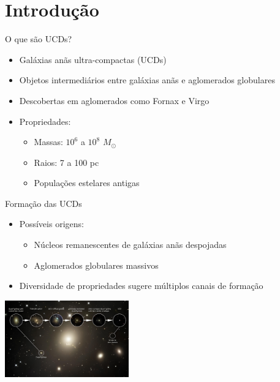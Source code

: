 \section{Introdução}


\begin{frame}[c]{O que são UCDs?}
    \begin{itemize}
        \item Galáxias anãs ultra-compactas (UCDs)
        \item Objetos intermediários entre galáxias anãs e aglomerados globulares
        \item Descobertas em aglomerados como Fornax e Virgo
        \item Propriedades:
        \begin{itemize}
            \item Massas: $10^6$ a $10^8$ $M_\odot$
            \item Raios: 7 a 100 pc
            \item Populações estelares antigas
        \end{itemize}
    \end{itemize}
    \vspace{0.5cm}
    \centering
\end{frame}

\begin{frame}[c]{Formação das UCDs}
    \begin{itemize}
        \item Possíveis origens:
        \begin{itemize}
            \item Núcleos remanescentes de galáxias anãs despojadas
            \item Aglomerados globulares massivos
        \end{itemize}
        \item Diversidade de propriedades sugere múltiplos canais de formação
    \end{itemize}
    \vspace{0.5cm}
    \centering
    \includegraphics[width=0.4\textwidth]{images/continuo_evolution_dwarf.png}
\end{frame}


